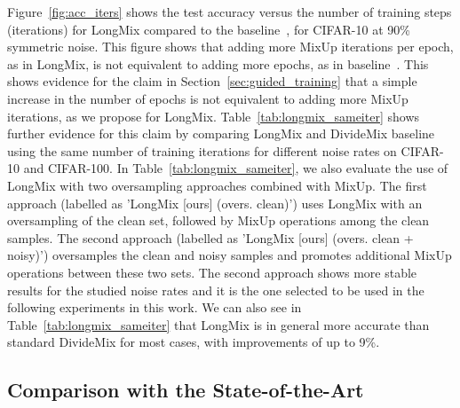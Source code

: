 \documentclass[review]{elsarticle}
\begin{document}
Figure~\ref{fig:acc_iters} shows the test accuracy versus the number of training steps (iterations) for LongMix compared to the baseline~\cite{li2020dividemix}, for CIFAR-10 at 90\% symmetric noise. This figure shows that adding more MixUp iterations per epoch, as in LongMix, is not equivalent to adding more epochs, as in baseline~\cite{li2020dividemix}.
This shows evidence for the claim in Section~\ref{sec:guided_training} that a simple increase in the number of epochs is not equivalent to adding more MixUp iterations, as we propose for LongMix.
Table~\ref{tab:longmix_sameiter} shows further evidence for this claim by comparing LongMix and DivideMix baseline~\cite{li2020dividemix} using the same number of training iterations for different noise rates on CIFAR-10 and CIFAR-100. In Table~\ref{tab:longmix_sameiter}, we also evaluate the use of LongMix with two oversampling approaches combined with MixUp. The first approach (labelled as 'LongMix [ours] (overs. clean)') uses LongMix with an oversampling of the clean set, followed by MixUp operations among the clean samples. The second approach (labelled as 'LongMix [ours] (overs. clean + noisy)') oversamples the clean and noisy samples and promotes additional MixUp operations between these two sets. The second approach shows more stable results for the studied noise rates and it is the one selected to be used in the following experiments in this work. We can also see in Table~\ref{tab:longmix_sameiter} that LongMix is in general more accurate than standard DivideMix for most cases, with improvements of up to 9\%.



\subsection{Comparison with the State-of-the-Art}
\end{document}
